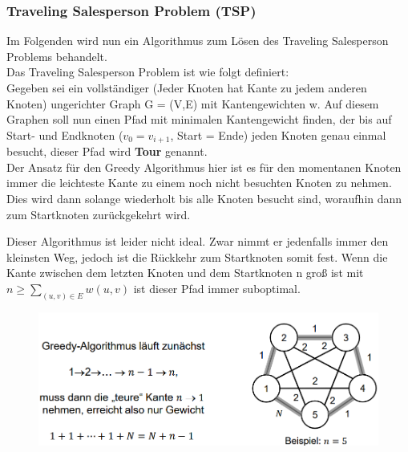 \documentclass[
../../AuD-Zusammenfassung.tex,
]
{subfiles}
\begin{document}
\subsubsection{Traveling Salesperson Problem (TSP)}
Im Folgenden wird nun ein Algorithmus zum Lösen des Traveling Salesperson Problems behandelt.\\
Das Traveling Salesperson Problem ist wie folgt definiert:\\
Gegeben sei ein vollständiger (Jeder Knoten hat Kante zu jedem anderen Knoten) ungerichter Graph G = (V,E) mit Kantengewichten w. Auf diesem Graphen soll nun einen Pfad mit minimalen Kantengewicht finden, der bis auf Start- und Endknoten ($v_0 = v_{i+1}$, Start = Ende) jeden Knoten genau einmal besucht, dieser Pfad wird \textbf{Tour} genannt.\\
Der Ansatz für den Greedy Algorithmus hier ist es für den momentanen Knoten immer die leichteste Kante zu einem noch nicht besuchten Knoten zu nehmen. Dies wird dann solange wiederholt bis alle Knoten besucht sind, woraufhin dann zum Startknoten zurückgekehrt wird.\\
\begin{algorithm}[H]
\end{algorithm}
Dieser Algorithmus ist leider nicht ideal. Zwar nimmt er jedenfalls immer den kleinsten Weg, jedoch ist die Rückkehr zum Startknoten somit fest. Wenn die Kante zwischen dem letzten Knoten und dem Startknoten n groß ist mit $n \geq \sum_{(u,v) \in E} w(u,v)$ ist dieser Pfad immer suboptimal.
\begin{figure}[htp]
    \centering
    \includegraphics[scale = 0.5]{Pics/TSPBad.png}
\end{figure}
\newpage
\end{document}
